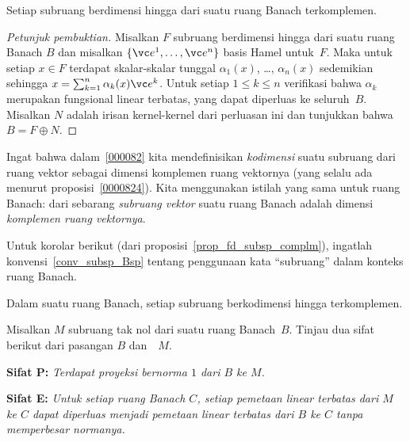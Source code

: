 \begin{prop}\label{prop_fd_subsp_complm} Setiap subruang berdimensi hingga dari suatu ruang Banach terkomplemen.
\end{prop}

\begin{proof}[\emph{Petunjuk pembuktian}] Misalkan $F$ subruang berdimensi hingga dari suatu ruang Banach $B$ dan misalkan
$\{\vc e^1, \dots, \vc e^n\}$ basis Hamel untuk~$F$. Maka untuk setiap $x \in F$ terdapat skalar-skalar tunggal
$\alpha_1(x)$, \dots , $\alpha_n(x)$ sedemikian sehingga $x = \sum_{k=1}^n \alpha_k(x)\vc e^k$. Untuk setiap $1 \le k \le n$
verifikasi bahwa $\alpha_k$ merupakan fungsional linear terbatas, yang dapat diperluas ke seluruh~$B$. Misalkan $N$ adalah
irisan kernel-kernel dari perluasan ini dan tunjukkan bahwa $B = F \oplus N$.  \ns
\end{proof}

\begin{defn} Ingat bahwa dalam~\ref{000082} kita mendefinisikan \emph{kodimensi} suatu subruang dari ruang vektor
sebagai dimensi komplemen ruang vektornya (yang selalu ada menurut proposisi~\ref{0000824}). Kita menggunakan
istilah yang sama untuk ruang Banach:
 dari sebarang \emph{subruang vektor} suatu ruang Banach adalah dimensi \emph{komplemen ruang
vektornya}.
\end{defn}

Untuk korolar berikut (dari proposisi~\ref{prop_fd_subsp_complm}), ingatlah
konvensi~\ref{conv_subsp_Bsp} tentang penggunaan kata ``subruang'' dalam konteks ruang Banach.

\begin{cor} Dalam suatu ruang Banach, setiap subruang berkodimensi hingga terkomplemen.
\end{cor}





















Misalkan $M$ subruang tak nol dari suatu ruang Banach~$B$. Tinjau dua sifat berikut dari pasangan $B$ dan~~$M$.

\textbf{Sifat P:} \emph{Terdapat proyeksi bernorma $1$ dari $B$ ke $M$.}

\textbf{Sifat E:} \emph{Untuk setiap ruang Banach $C$, setiap pemetaan linear terbatas dari $M$ ke $C$ dapat diperluas menjadi pemetaan
linear terbatas dari $B$ ke $C$ tanpa memperbesar normanya.}


